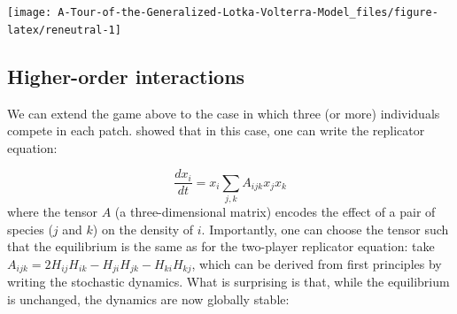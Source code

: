 \documentclass[]{book}
\begin{document}
\begin{center}\texttt{[image: A-Tour-of-the-Generalized-Lotka-Volterra-Model\_files/figure-latex/reneutral-1]} \end{center}

\hypertarget{higher-order-interactions}{%
\subsection{Higher-order interactions}\label{higher-order-interactions}}

We can extend the game above to the case in which three (or more) individuals compete in each patch. \citet{grilli2017higher} showed that in this case, one can write the replicator equation:

\[
\dfrac{d x_i}{dt} = x_i \sum_{j,k} A_{ijk} x_j x_k
\]
where the tensor \(A\) (a three-dimensional matrix) encodes the effect of a pair of species (\(j\) and \(k\)) on the density of \(i\). Importantly, one can choose the tensor such that the equilibrium is the same as for the two-player replicator equation: take \(A_{ijk} = 2 H_{ij} H_{ik} - H_{ji} H_{jk} - H_{ki} H_{kj}\), which can be derived from first principles by writing the stochastic dynamics. What is surprising is that, while the equilibrium is unchanged, the dynamics are now globally stable:
\end{document}

